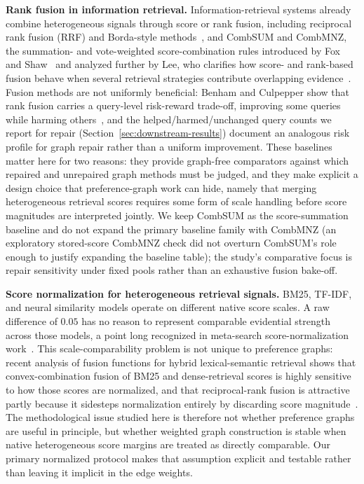 \documentclass[manuscript,anonymous,review]{acmart}
\begin{document}
\textbf{Rank fusion in information retrieval.} Information-retrieval systems
already combine heterogeneous signals through score or rank fusion, including
reciprocal rank fusion (RRF) and Borda-style methods~\cite{cormack2009rrf}, and
CombSUM and CombMNZ, the summation- and vote-weighted score-combination rules
introduced by Fox and Shaw~\cite{fox1994combination} and analyzed further by
Lee, who clarifies how score- and rank-based fusion behave when several
retrieval strategies contribute overlapping evidence~\cite{lee1997analyses}.
Fusion methods are not uniformly beneficial: Benham and Culpepper show that
rank fusion carries a query-level risk-reward trade-off, improving some
queries while harming others~\cite{benham2017risk}, and the
helped/harmed/unchanged query counts we report for repair
(Section~\ref{sec:downstream-results}) document an analogous risk profile for
graph repair rather than a uniform improvement. These baselines matter here
for two reasons: they provide graph-free comparators against which repaired
and unrepaired graph methods must be judged, and they make explicit a design
choice that preference-graph work can hide, namely that merging heterogeneous
retrieval scores requires some form of scale handling before score magnitudes
are interpreted jointly. We keep CombSUM as the score-summation baseline and
do not expand the primary baseline family with CombMNZ (an exploratory
stored-score CombMNZ check did not overturn CombSUM's role enough to justify
expanding the baseline table); the study's comparative focus is repair
sensitivity under fixed pools rather than an exhaustive fusion bake-off.

\textbf{Score normalization for heterogeneous retrieval signals.} BM25, TF-IDF,
and neural similarity models operate on different native score scales. A raw
difference of $0.05$ has no reason to represent comparable evidential strength
across those models, a point long recognized in meta-search score-normalization
work~\cite{manmatha2002formal}. This scale-comparability problem is not unique to
preference graphs: recent analysis of fusion functions for hybrid lexical-semantic
retrieval shows that convex-combination fusion of BM25 and dense-retrieval
scores is highly sensitive to how those scores are normalized, and that
reciprocal-rank fusion is attractive partly because it sidesteps normalization
entirely by discarding score magnitude~\cite{bruch2023analysis}. The
methodological issue studied here is therefore not whether preference graphs
are useful in principle, but whether weighted graph construction is stable
when native heterogeneous score margins are treated as directly comparable.
Our primary normalized protocol makes that assumption explicit and testable
rather than leaving it implicit in the edge weights.
\end{document}
